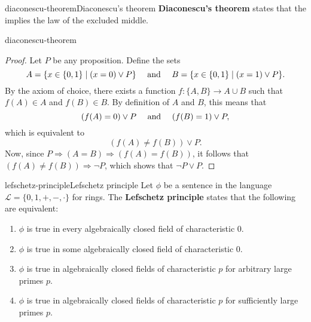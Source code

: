 \begin{topic}{diaconescu-theorem}{Diaconescu's theorem}
    \textbf{Diaconescu's theorem} states that the  implies the law of the excluded middle.
\end{topic}

\begin{example}{diaconescu-theorem}
    \begin{proof}
        Let $P$ be any proposition. Define the sets
        \[ A = \{ x \in \{ 0, 1 \} \mid (x = 0) \lor P \} \quad \textup{ and } \quad B = \{ x \in \{ 0, 1 \} \mid (x = 1) \lor P \} . \]
        By the axiom of choice, there exists a function $f : \{ A, B \} \to A \cup B$ such that $f(A) \in A$ and $f(B) \in B$. By definition of $A$ and $B$, this means that
        \[ (f(A) = 0) \lor P \quad \textup{ and } \quad (f(B) = 1) \lor P , \]
        which is equivalent to
        \[ (f(A) \ne f(B)) \lor P . \]
        Now, since $P \Rightarrow (A = B) \Rightarrow (f(A) = f(B))$, it follows that $(f(A) \ne f(B)) \Rightarrow \neg P$, which shows that $\neg P \lor P$.
    \end{proof}
\end{example}

\begin{topic}{lefschetz-principle}{Lefschetz principle}
    Let $\phi$ be a sentence in the language $\mathcal{L} = \{ 0, 1, +, -, \cdot \}$ for rings. The \textbf{Lefschetz principle} states that the following are equivalent:
    \begin{enumerate}[label=(\roman*)]
        \item $\phi$ is true in every algebraically closed field of characteristic $0$.
        \item $\phi$ is true in some algebraically closed field of characteristic $0$.
        \item $\phi$ is true in algebraically closed fields of characteristic $p$ for arbitrary large primes $p$.
        \item $\phi$ is true in algebraically closed fields of characteristic $p$ for sufficiently large primes $p$.
    \end{enumerate}
\end{topic}
